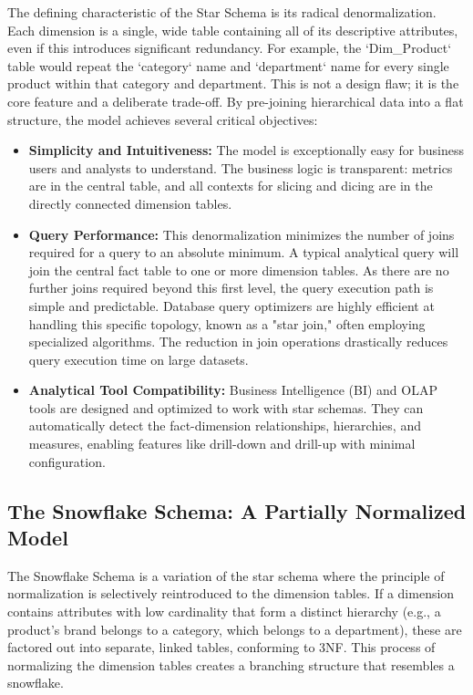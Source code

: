 The defining characteristic of the Star Schema is its radical denormalization. Each dimension is a single, wide table containing all of its descriptive attributes, even if this introduces significant redundancy. For example, the `Dim\_Product` table would repeat the `category` name and `department` name for every single product within that category and department. This is not a design flaw; it is the core feature and a deliberate trade-off. By pre-joining hierarchical data into a flat structure, the model achieves several critical objectives:
\begin{itemize}
    \item \textbf{Simplicity and Intuitiveness:} The model is exceptionally easy for business users and analysts to understand. The business logic is transparent: metrics are in the central table, and all contexts for slicing and dicing are in the directly connected dimension tables.
    \item \textbf{Query Performance:} This denormalization minimizes the number of joins required for a query to an absolute minimum. A typical analytical query will join the central fact table to one or more dimension tables. As there are no further joins required beyond this first level, the query execution path is simple and predictable. Database query optimizers are highly efficient at handling this specific topology, known as a "star join," often employing specialized algorithms. The reduction in join operations drastically reduces query execution time on large datasets.
    \item \textbf{Analytical Tool Compatibility:} Business Intelligence (BI) and OLAP tools are designed and optimized to work with star schemas. They can automatically detect the fact-dimension relationships, hierarchies, and measures, enabling features like drill-down and drill-up with minimal configuration.
\end{itemize}

\subsection{The Snowflake Schema: A Partially Normalized Model}
The Snowflake Schema is a variation of the star schema where the principle of normalization is selectively reintroduced to the dimension tables. If a dimension contains attributes with low cardinality that form a distinct hierarchy (e.g., a product's brand belongs to a category, which belongs to a department), these are factored out into separate, linked tables, conforming to 3NF. This process of normalizing the dimension tables creates a branching structure that resembles a snowflake.

